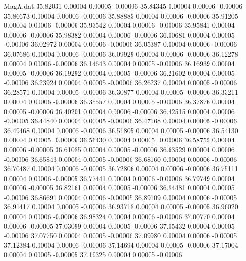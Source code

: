 \begin{filecontents}{MagA.dat}
  35.82031    0.00004    0.00005   -0.00006
  35.84345    0.00004    0.00006   -0.00006
  35.86673    0.00004    0.00006   -0.00006
  35.88885    0.00004    0.00006   -0.00006
  35.91205    0.00004    0.00006   -0.00006
  35.93542    0.00004    0.00006   -0.00006
  35.95841    0.00004    0.00006   -0.00006
  35.98382    0.00004    0.00006   -0.00006
  36.00681    0.00004    0.00005   -0.00006
  36.02972    0.00004    0.00006   -0.00006
  36.05387    0.00004    0.00006   -0.00006
  36.07686    0.00004    0.00006   -0.00006
  36.09929    0.00004    0.00006   -0.00006
  36.12278    0.00004    0.00006   -0.00006
  36.14643    0.00004    0.00005   -0.00006
  36.16939    0.00004    0.00005   -0.00006
  36.19292    0.00004    0.00005   -0.00006
  36.21602    0.00004    0.00005   -0.00006
  36.23924    0.00004    0.00005   -0.00006
  36.26237    0.00004    0.00005   -0.00006
  36.28571    0.00004    0.00005   -0.00006
  36.30877    0.00004    0.00005   -0.00006
  36.33211    0.00004    0.00006   -0.00006
  36.35557    0.00004    0.00005   -0.00006
  36.37876    0.00004    0.00005   -0.00006
  36.40201    0.00004    0.00006   -0.00006
  36.42515    0.00004    0.00006   -0.00005
  36.44840    0.00004    0.00005   -0.00006
  36.47168    0.00004    0.00005   -0.00006
  36.49468    0.00004    0.00006   -0.00006
  36.51805    0.00004    0.00005   -0.00006
  36.54130    0.00004    0.00005   -0.00006
  36.56430    0.00004    0.00005   -0.00006
  36.58755    0.00004    0.00006   -0.00005
  36.61085    0.00004    0.00005   -0.00006
  36.63529    0.00004    0.00006   -0.00006
  36.65843    0.00004    0.00005   -0.00006
  36.68160    0.00004    0.00006   -0.00006
  36.70487    0.00004    0.00006   -0.00005
  36.72806    0.00004    0.00006   -0.00006
  36.75111    0.00004    0.00006   -0.00005
  36.77441    0.00004    0.00006   -0.00006
  36.79749    0.00004    0.00006   -0.00005
  36.82161    0.00004    0.00005   -0.00006
  36.84481    0.00004    0.00005   -0.00006
  36.86691    0.00004    0.00006   -0.00005
  36.89109    0.00004    0.00006   -0.00005
  36.91417    0.00004    0.00005   -0.00006
  36.93718    0.00004    0.00005   -0.00005
  36.96020    0.00004    0.00006   -0.00006
  36.98324    0.00004    0.00006   -0.00006
  37.00770    0.00004    0.00006   -0.00005
  37.03099    0.00004    0.00005   -0.00006
  37.05432    0.00004    0.00005   -0.00006
  37.07750    0.00004    0.00005   -0.00006
  37.09980    0.00004    0.00006   -0.00005
  37.12384    0.00004    0.00006   -0.00006
  37.14694    0.00004    0.00005   -0.00006
  37.17004    0.00004    0.00005   -0.00005
  37.19325    0.00004    0.00005   -0.00006

\end{filecontents}
